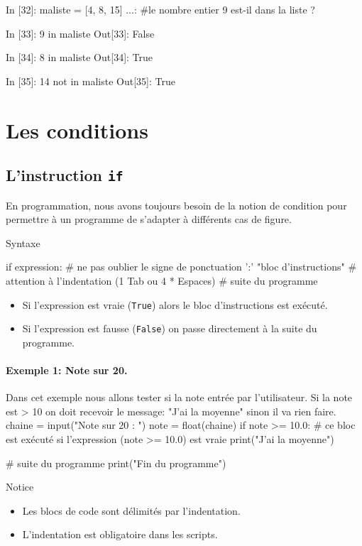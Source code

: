 \documentclass[%
oneside,                 %
final,                   %
10pt]{article}
\begin{document}
\bipy

In [32]: maliste = [4, 8, 15]
    ...: #le nombre entier 9 est-il dans la liste ?

In [33]: 9 in maliste
Out[33]: False

In [34]: 8 in maliste
Out[34]: True

In [35]: 14 not in maliste
Out[35]: True
\eipy

\section{Les conditions}
\subsection{L'instruction \texttt{if} }
En programmation, nous avons toujours besoin de la notion de condition pour permettre à un programme de s'adapter à différents cas de figure.

\begin{block}{Syntaxe }

\bpycod
if expression: # ne pas oublier le signe de ponctuation ':'
    "bloc d'instructions" # attention à l'indentation (1 Tab ou 4 * Espaces)
# suite du programme
\epycod
\begin{itemize}
\item Si l'expression est vraie (\texttt{True}) alors le bloc d'instructions est exécuté.

\item Si l'expression est fausse (\texttt{False}) on passe directement à la suite du programme.
\end{itemize}

\noindent
\end{block}


\paragraph{Exemple 1: Note sur 20.}
Dans cet exemple nous allons tester si la note entrée par l'utilisateur. Si la note est > 10 on doit recevoir le message: "J'ai la moyenne" sinon il va rien faire.
\bpycod
chaine = input("Note sur 20 : ")
note = float(chaine)
if note >= 10.0:
    # ce bloc est exécuté si l'expression (note >= 10.0) est vraie
    print("J'ai la moyenne")

# suite du programme
print("Fin du programme")
\epycod

\begin{block}{Notice}
\begin{itemize}
\item Les blocs de code sont délimités par l'indentation.

\item L'indentation est obligatoire dans les scripts.
\end{itemize}

\noindent
\end{block}
\end{document}
